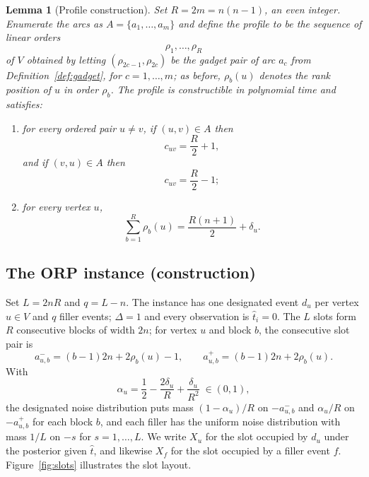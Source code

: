 \documentclass[11pt]{article}
\newtheorem{lemma}{Lemma}
\begin{document}
\begin{lemma}[Profile construction]\label{lem:profile}
Set $R=2m=n(n-1)$, an even integer.  Enumerate the arcs as $A=\{a_1,\ldots,a_m\}$ and define the \emph{profile} to be the sequence of linear orders
\begin{equation}
  \rho_1,\ldots,\rho_R
\end{equation}
of $V$ obtained by letting $(\rho_{2c-1},\rho_{2c})$ be the gadget pair of arc $a_c$ from Definition~\ref{def:gadget}, for $c=1,\ldots,m$; as before, $\rho_b(u)$ denotes the rank position of $u$ in order $\rho_b$.  The profile is constructible in polynomial time and satisfies:
\begin{enumerate}[label=(\roman*)]
\item for every ordered pair $u\ne v$, if $(u,v)\in A$ then
\begin{equation}
  c_{uv}=\frac R2+1,
\end{equation}
and if $(v,u)\in A$ then
\begin{equation}
  c_{uv}=\frac R2-1;
\end{equation}
\item for every vertex $u$,
\begin{equation}
  \sum_{b=1}^R \rho_b(u)=\frac{R(n+1)}2+\delta_u.
\end{equation}
\end{enumerate}
\end{lemma}

\subsection*{The ORP instance (construction)}

Set $L=2nR$ and $q=L-n$.  The instance has one designated event $d_u$ per vertex $u\in V$ and $q$ filler events; $\Delta=1$ and every observation is $\hat t_i=0$.  The $L$ slots form $R$ consecutive blocks of width $2n$; for vertex $u$ and block $b$, the consecutive slot pair is
\begin{equation}
  a^-_{u,b}=(b-1)2n+2\rho_b(u)-1,\qquad a^+_{u,b}=(b-1)2n+2\rho_b(u).
\end{equation}
With
\begin{equation}
  \alpha_u=\frac12-\frac{2\delta_u}{R}+\frac{\delta_u}{R^2}\;\in(0,1),
\end{equation}
the designated noise distribution puts mass $(1-\alpha_u)/R$ on $-a^-_{u,b}$ and $\alpha_u/R$ on $-a^+_{u,b}$ for each block $b$, and each filler has the uniform noise distribution with mass $1/L$ on $-s$ for $s=1,\ldots,L$.  We write $X_u$ for the slot occupied by $d_u$ under the posterior given $\hat t$, and likewise $X_f$ for the slot occupied by a filler event $f$.  Figure~\ref{fig:slots} illustrates the slot layout.
\end{document}
